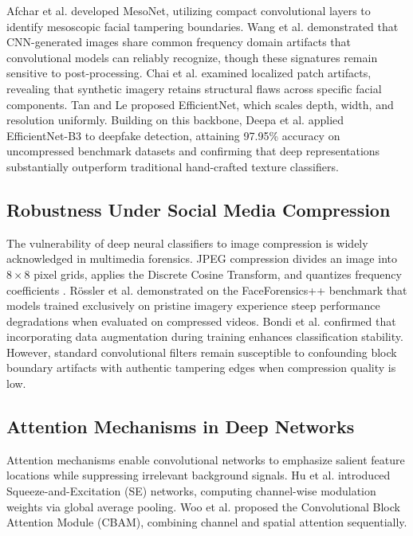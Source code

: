 \documentclass[conference]{IEEEtran}
\begin{document}
Afchar et al. \cite{afchar2018mesonet} developed MesoNet, utilizing compact convolutional layers to identify mesoscopic facial tampering boundaries. Wang et al. \cite{wang2020cnn} demonstrated that CNN-generated images share common frequency domain artifacts that convolutional models can reliably recognize, though these signatures remain sensitive to post-processing. Chai et al. \cite{chai2020what} examined localized patch artifacts, revealing that synthetic imagery retains structural flaws across specific facial components. Tan and Le \cite{tan2019efficientnet} proposed EfficientNet, which scales depth, width, and resolution uniformly. Building on this backbone, Deepa et al. \cite{deepa2026enhanced} applied EfficientNet-B3 to deepfake detection, attaining 97.95\% accuracy on uncompressed benchmark datasets and confirming that deep representations substantially outperform traditional hand-crafted texture classifiers.

\subsection{Robustness Under Social Media Compression}
The vulnerability of deep neural classifiers to image compression is widely acknowledged in multimedia forensics. JPEG compression divides an image into $8 \times 8$ pixel grids, applies the Discrete Cosine Transform, and quantizes frequency coefficients \cite{verdoliva2020media}. R{\"o}ssler et al. \cite{rossler2019faceforensics} demonstrated on the FaceForensics++ benchmark that models trained exclusively on pristine imagery experience steep performance degradations when evaluated on compressed videos. Bondi et al. \cite{bondi2020training} confirmed that incorporating data augmentation during training enhances classification stability. However, standard convolutional filters remain susceptible to confounding block boundary artifacts with authentic tampering edges when compression quality is low.

\subsection{Attention Mechanisms in Deep Networks}
Attention mechanisms enable convolutional networks to emphasize salient feature locations while suppressing irrelevant background signals. Hu et al. \cite{hu2018squeeze} introduced Squeeze-and-Excitation (SE) networks, computing channel-wise modulation weights via global average pooling. Woo et al. \cite{woo2018cbam} proposed the Convolutional Block Attention Module (CBAM), combining channel and spatial attention sequentially.
\end{document}
